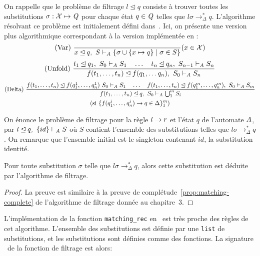 On rappelle que le problème de filtrage $l \unlhd q$ consiste à trouver toutes les substitutions
$\sigma:\mathcal X \mapsto \mathit Q$ pour chaque état $q \in \mathit Q$ telles que 
$l\sigma \rightarrow_\Delta^* q$. L'algorithme résolvant ce problème est initialement 
défini dans~\cite{Genet-RR97b}. Ici, on présente une version plus algorithmique correspondant 
à la version implémentée en \coq:
{\footnotesize
  \[\textrm{(Var) }
  \dfrac{}{x \unlhd q,\ S \vdash_\mathit A \{\sigma \cup \{x \mapsto q\} \; | \; \sigma \in S \}}
  (x \in \mathcal X)
  \]
  \[\textrm{(Unfold) }
  \dfrac{
    t_1 \unlhd q_1, \ S_0 \vdash_\mathit A S_1
    \quad \dots \quad
    t_n \unlhd q_n, \ S_{n-1} \vdash_\mathit A S_n
  }{f(t_1, \dots, t_n) \unlhd f(q_1, \dots q_n),\ S_0 \vdash_\mathit A S_n}
  \]
  \begin{multline*}
    \textrm{(Delta) }
    \dfrac{
      f(t_1, \dots, t_n) \unlhd f(q_1^1, \dots, q_n^1)\ S_0 \vdash_\mathit A S_1
      \quad \dots \quad
      f(t_1 ,\dots, t_n) \unlhd f(q_1^m, \dots, q_n^m),\ S_0 \vdash_\mathit A S_m
    }{
      f(t_1, \dots, t_n) \unlhd q,\ S_0 \vdash_\mathit A \bigcup_1^m S_i
    }\\
    (
    \textrm{si } \{ f(q_1^i, \dots, q_n^i) \rightarrow q \in \Delta\} _1^m 
    )
  \end{multline*}
}

On énonce le problème de filtrage pour la règle $l \rightarrow r$ et l'état $q$ de l'automate $\mathit A$,
par $l\unlhd q,\ \{id\} \vdash_\mathit A S$ où $S$ contient l'ensemble des substitutions telles que
$l\sigma \rightarrow_\Delta^* q$. On remarque que l'ensemble initial est le singleton contenant $id$,
la substitution identité.

\begin{theorem}
  \label{th:completeness}
  Pour toute substitution $\sigma$ telle que $l\sigma \rightarrow_\Delta^* q$, alors 
  cette substitution est déduite par l'algorithme de filtrage.
\end{theorem}

\begin{proof}
  La preuve est similaire à la preuve de complétude~\ref{prop:matching-complete} de l'algorithme de filtrage
  donnée au chapitre~3.
\end{proof}

L'implémentation de la fonction \lstinline!matching_rec! en \coq\ est très proche
des règles de cet algorithme. L'ensemble des substitutions est définie par une 
\lstinline!list! de substitutions, et les substitutions sont définies comme des fonctions.
La signature \coq\ de la fonction de filtrage est alors:

